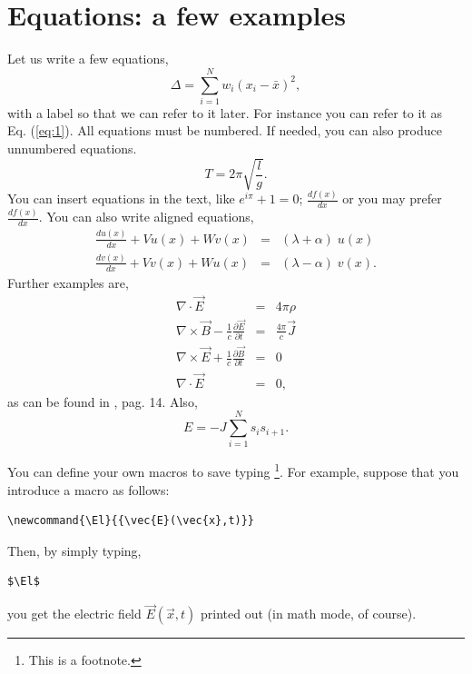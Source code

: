 \documentclass[twocolumn]{revtex4}
\begin{document}
\section{Equations: a few examples}
Let us write a few equations,
\begin{equation}
\Delta =\sum_{i=1}^N w_i (x_i - \bar{x})^2, 
\label{eq:1}
\end{equation}
with a label so that we can refer to it later. For instance you can refer 
to it as Eq. (\ref{eq:1}).
All equations must be numbered.
If needed, you can also produce unnumbered equations.
\begin{equation}
T = 2 \pi \sqrt{\frac{l}{g}}. \nonumber
\end{equation}
You can insert equations in the text, like $e^{i \pi} +1=0$; 
$\frac{df(x)}{dx}$ or you may prefer 
$\displaystyle \frac{df(x)}{dx}$.
You can also write aligned equations,
\begin{eqnarray}
\frac{du(x)}{dx}+V u(x) +W v(x) &=& (\lambda + \alpha)  \; u(x) \nonumber \\
\frac{dv(x)}{dx}+V v(x) +W u(x) &=& (\lambda - \alpha) \; v(x).
\label{eq:tercera}\end{eqnarray}
Further examples are,
\begin{eqnarray}
\nabla {\cdot} \vec{E}&=& 4 \pi \rho \nonumber \\
\nabla \times \vec{B} - \frac{1}{c} \frac{\partial \vec{E}}{\partial t} &=&
\frac{4 \pi}{c} \vec{J} \nonumber \\
\nabla \times \vec{E} +\frac{1}{c} \frac{\partial \vec{B}}{\partial t} &=&
0 \nonumber \\
\nabla {\cdot} \vec{E}&=& 0,
\label{maxwell}
\end{eqnarray}
as can be found in \cite{jackson}, pag. 14. Also,
\begin{equation}
E = -J \sum_{i=1}^N s_i s_{i+1}.
\label{eq:ising}
\end{equation}

You can define your own macros to save typing
\footnote{This is a footnote.}. 
For example, suppose
that you introduce a macro as follows:
\newcommand{\El}{{\vec{E}(\vec{x},t)}}
\begin{verbatim}
\newcommand{\El}{{\vec{E}(\vec{x},t)}}
\end{verbatim}
Then, by simply typing,  
\begin{verbatim}
$\El$
\end{verbatim}
you get the electric field $\El$ printed out (in math mode, of course).
\end{document}
